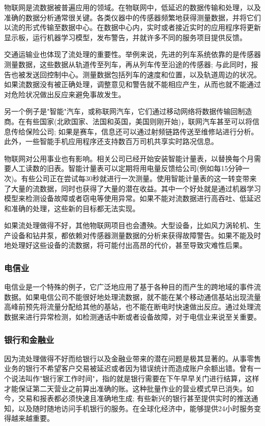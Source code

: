 \documentclass[oneside]{ctexbook}
\begin{document}
物联网是流数据被普遍应用的领域。在物联网中，低延迟的数据传输和处理，以及准确的数据分析通常很关键。各类仪器中的传感器频繁地获得测量数据，并将它们以流的形式传输至数据中心。在数据中心内，实时或者接近实时的应用程序将更新显示板，运行机器学习模型，发布警告，并就许多不同的服务项目提供反馈。

交通运输业也体现了流处理的重要性。举例来说，先进的列车系统依靠的是传感器测量数据，这些数据从轨道传至列车，再从列车传至沿途的传感器; 与此同时，报告也被发送回控制中心。测量数据包括列车的速度和位置，以及轨道周边的状况。如果流数据没有被正确处理，调整意见和警告就不能相应产生，从而也就不能通过对危险状况做出反应来避免事故发生。

另一个例子是"智能"汽车，或称联网汽车，它们通过移动网络将数据传输回制造商。在有些国家(北欧国家、法国和英国，美国则刚开始)，联网汽车甚至可以将信息传给保险公司; 如果是赛车，信息还可以通过射频链路传送至维修站进行分析。此外，一些智能手机应用程序还支持数百万司机共享实时路况信息。

物联网对公用事业也有影响。相关公司已经开始安装智能计量表，以替换每个月需要人工读数的旧表。智能计量表可以定期将用电量反馈给公司(例如每15分钟一次)。有些公司正在尝试每30秒就进行一次测量。使用智能计量表的这一转变带来了大量的流数据，同时也获得了大量的潜在收益。其中一个好处就是通过机器学习模型来检测设备故障或者窃电等使用异常。如果不能对流数据进行高吞吐、低延迟和准确的处理，这些新的目标都无法实现。

如果流处理做得不好，其他物联网项目也会遭殃。大型设备，比如风力涡轮机、生产设备和钻井泵，都依赖对传感器测量数据的分析来获得故障警告。如果不能及时地处理好这些设备的流数据，将可能付出高昂的代价，甚至导致灾难性后果。

\subsubsection{电信业}

电信业是一个特殊的例子，它广泛地应用了基于各种目的而产生的跨地域的事件流数据。如果电信公司不能很好地处理流数据，就不能在某个移动通信基站出现流量高峰前预先将流量分配给其他的基站，也不能在断电时快速做出反应。通过处理流数据来进行异常检测，如检测通话中断或者设备故障，对于电信业来说至关重要。

\subsubsection{银行和金融业}

因为流处理做得不好而给银行以及金融业带来的潜在问题是极其显著的。从事零售业务的银行不希望客户交易被延迟或者因为错误统计而造成账户余额出错。曾有一个说法叫作"银行家工作时间"，指的就是银行需要在下午早早关门进行结算，这样才能保证第二天营业之前算出准确的账。这种批量作业的营业模式早已消失。如今，交易和报表都必须快速且准确地生成; 有些新兴的银行甚至提供实时的推送通知，以及随时随地访问手机银行的服务。在全球化经济中，能够提供24小时服务变得越来越重要。
\end{document}

